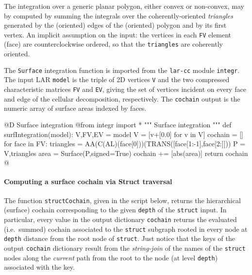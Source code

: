 \documentclass[11pt,oneside]{article}    %
\begin{document}
The integration over a generic planar polygon, either convex or non-convex, may by computed by summing the integrals over the coherently-oriented \emph{triangles} generated by the (oriented) edges of the (oriented) polygon and by its first vertex. An implicit assumption on the input: the vertices in each \texttt{FV} element (face) are counterclockwise ordered, so that the \texttt{triangles} are coherently oriented.

The \texttt{Surface} integration function is imported from the \texttt{lar-cc} module \texttt{integr}. The input LAR \texttt{model} is the triple of 2D vertices \texttt{V} and the two compressed characteristic matrices \texttt{FV} and \texttt{EV}, giving the set of vertices incident on every face and edge of the cellular decomposition, respectively. The \texttt{cochain} output is the numeric array of surface areas indexed by faces. 

@D Surface integration
@{from integr import *
""" Surface integration """
def surfIntegration(model):
    V,FV,EV = model
    V = [v+[0.0] for v in V]
    cochain = []
    for face in FV:
        triangles = AA(C(AL)(face[0]))(TRANS([face[1:-1],face[2:]]))
        P = V,triangles
        area = Surface(P,signed=True) 
        cochain += [abs(area)]
    return cochain
@}


\paragraph{Computing a surface cochain via Struct traversal}

The function \texttt{structCochain}, given in the script below, returns the hierarchical (surface) cochain corresponding to the given \texttt{depth} of the \texttt{struct} input. In particular, every value in the output dictionary \texttt{cochain} returns the evaluated (i.e.~summed) cochain associated to the \texttt{struct} subgraph rooted in every node at  \texttt{depth} distance from the root node of \texttt{struct}. Just notice that the keys of the output \texttt{cochain} dictionary result from the \emph{string-join} of the names of the \texttt{struct} nodes along the \emph{current} path from the root to the node (at level \texttt{depth}) associated with the key.
\end{document}
